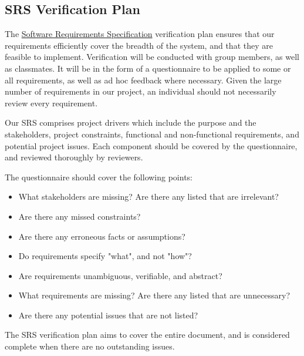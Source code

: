 \documentclass[12pt, titlepage]{article}
\begin{document}
\subsection{SRS Verification Plan}
\label{sec:srs}
The
\href{https://github.com/parkd-app/park-d/blob/main/docs/SRS/SRS.pdf}{Software
Requirements Specification} verification plan ensures that our requirements
efficiently cover the breadth of the system, and that they are feasible to
implement. Verification will be conducted with group members, as well as
classmates. It will be in the form of a questionnaire to be applied to some or
all requirements, as well as ad hoc feedback where necessary. Given the large
number of requirements in our project, an individual should not necessarily
review every requirement.

Our SRS comprises project drivers which include the purpose and the
stakeholders, project constraints, functional and non-functional requirements,
and potential project issues. Each component should be covered by the
questionnaire, and reviewed thoroughly by reviewers.

The questionnaire should cover the following points:
\begin{itemize}
    \item What stakeholders are missing? Are there any listed that are
    irrelevant?
    \item Are there any missed constraints?
    \item Are there any erroneous facts or assumptions?
    \item Do requirements specify "what", and not "how"?
    \item Are requirements unambiguous, verifiable, and abstract?
    \item What requirements are missing? Are there any listed that are
    unnecessary?
    \item Are there any potential issues that are not listed?
\end{itemize}

The SRS verification plan aims to cover the entire document, and is considered
complete when there are no outstanding issues.



\end{document}

